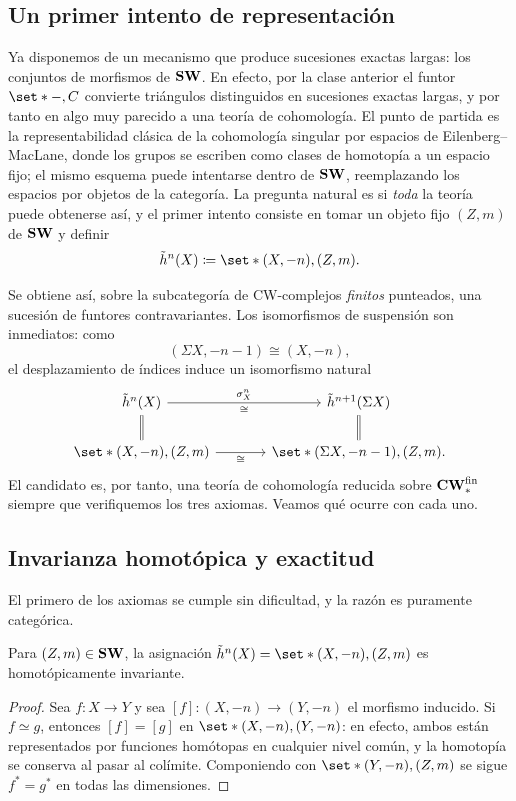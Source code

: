 \subsection{Un primer intento de representación}

Ya disponemos de un mecanismo que produce sucesiones exactas largas: los conjuntos de morfismos de $\mathbf{SW}$. En efecto, por la clase anterior el funtor $\set*{-,C}$ convierte triángulos distinguidos en sucesiones exactas largas, y por tanto en algo muy parecido a una teoría de cohomología. El punto de partida es la representabilidad clásica de la cohomología singular por espacios de Eilenberg--MacLane, donde los grupos se escriben como clases de homotopía a un espacio fijo; el mismo esquema puede intentarse dentro de $\mathbf{SW}$, reemplazando los espacios por objetos de la categoría. La pregunta natural es si \emph{toda} la teoría puede obtenerse así, y el primer intento consiste en tomar un objeto fijo $(Z,m)$ de $\mathbf{SW}$ y definir
\[
\tilde h^n(X)\coloneqq\set*{(X,-n),(Z,m)}.
\]

Se obtiene así, sobre la subcategoría de CW-complejos \emph{finitos} punteados, una sucesión de funtores contravariantes. Los isomorfismos de suspensión son inmediatos: como
\[
(\Sigma X,-n-1)\cong(X,-n),
\]
el desplazamiento de índices induce un isomorfismo natural
\[
\begin{tikzcd}[column sep=large]
\tilde h^n(X) \arrow[r,"\sigma^n_X","\cong"'] \arrow[d,equal] & \tilde h^{n+1}(\Sigma X) \arrow[d,equal]\\
\set*{(X,-n),(Z,m)} \arrow[r,"\cong"'] & \set*{(\Sigma X,-n-1),(Z,m)}.
\end{tikzcd}
\]
El candidato es, por tanto, una teoría de cohomología reducida sobre $\mathbf{CW}_*^{\mathrm{fin}}$ siempre que verifiquemos los tres axiomas. Veamos qué ocurre con cada uno.

\subsection{Invarianza homotópica y exactitud}

El primero de los axiomas se cumple sin dificultad, y la razón es puramente categórica.

\begin{prop}\label{prop:invarianza}
Para $(Z,m)\in\mathbf{SW}$, la asignación $\tilde h^n(X)=\set*{(X,-n),(Z,m)}$ es homotópicamente invariante.
\end{prop}
\begin{proof}
Sea $f\colon X\to Y$ y sea $[f]\colon(X,-n)\to(Y,-n)$ el morfismo inducido. Si $f\simeq g$, entonces $[f]=[g]$ en $\set*{(X,-n),(Y,-n)}$: en efecto, ambos están representados por funciones homótopas en cualquier nivel común, y la homotopía se conserva al pasar al colímite. Componiendo con $\set*{(Y,-n),(Z,m)}$ se sigue $f^*=g^*$ en todas las dimensiones.
\end{proof}

